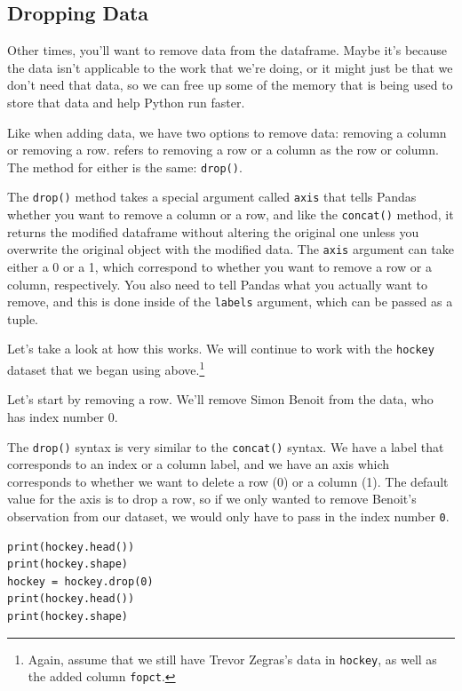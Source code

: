 \subsection{Dropping Data}
Other times, you'll want to remove data from the dataframe. Maybe it's because the data isn't applicable to the work that we're doing, or it might just be that we don't need that data, so we can free up some of the memory that is being used to store that data and help Python run faster.\par
Like when adding data, we have two options to remove data: removing a column or removing a row.  refers to removing a row or a column as  the row or column. The method for either is the same: \verb|drop()|.\par
The \verb|drop()| method takes a special argument called \verb|axis| that tells Pandas whether you want to remove a column or a row, and like the \verb|concat()| method, it returns the modified dataframe without altering the original one unless you overwrite the original object with the modified data. The \verb|axis| argument can take either a 0 or a 1, which correspond to whether you want to remove a row or a column, respectively. You also need to tell Pandas what you actually want to remove, and this is done inside of the \verb|labels| argument, which can be passed as a tuple.\par
Let's take a look at how this works. We will continue to work with the \verb|hockey| dataset that we began using above.\cprotect\footnote{Again, assume that we still have Trevor Zegras's data in \verb|hockey|, as well as the added column \verb|fopct|.}\par
Let's start by removing a row. We'll remove Simon Benoit from the data, who has index number 0.\par
{}
The \verb|drop()| syntax is very similar to the \verb|concat()| syntax. We have a label that corresponds to an index or a column label, and we have an axis which corresponds to whether we want to delete a row (0) or a column (1). The default value for the axis is to drop a row, so if we only wanted to remove Benoit's observation from our dataset, we would only have to pass in the index number \verb|0|.
\begin{lstlisting}[style=pippython]
print(hockey.head())
print(hockey.shape)
hockey = hockey.drop(0)
print(hockey.head())
print(hockey.shape)
\end{lstlisting}
